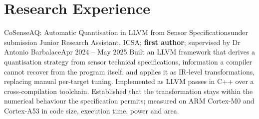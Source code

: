\section{Research Experience}

  \resumeSubHeadingListStart

    \resumeSubheading
      {CoSenseAQ: Automatic Quantisation in LLVM from Sensor Specifications}{under submission}
      {Junior Research Assistant, ICSA; \textbf{first author}; supervised by Dr Antonio Barbalace}{Apr 2024 -- May 2025}
      \resumeItemListStart
          {Built an LLVM framework that derives a quantisation strategy from sensor technical specifications, information a compiler cannot recover from the program itself, and applies it as IR-level transformations, replacing manual per-target tuning. Implemented as LLVM passes in C++ over a cross-compilation toolchain.}
          {Established that the transformation stays within the numerical behaviour the specification permits; measured on ARM Cortex-M0 and Cortex-A53 in code size, execution time, power and area.}
      \resumeItemListEnd

%

